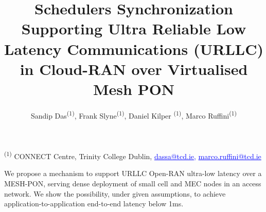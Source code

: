 \documentclass[a4paper, oneside, twocolumn, notitlepage, 10pt]{extarticle_ecoc}
\begin{document}


\title{Schedulers Synchronization Supporting Ultra Reliable Low Latency Communications (URLLC) in Cloud-RAN over Virtualised Mesh PON }%

\author{\vspace{-0.3in}
    Sandip Das\textsuperscript{(1)}, Frank Slyne\textsuperscript{(1)}, Daniel Kilper \textsuperscript{(1)}, Marco Ruffini\textsuperscript{(1)}
}

\maketitle                  %


\begin{strip}
 \begin{author_descr}

   \textsuperscript{(1)} CONNECT Centre, Trinity College Dublin,
   \textcolor{blue}{\uline{dassa@tcd.ie}, \uline{marco.ruffini@tcd.ie}}
 \end{author_descr}
\vspace{-0.1in}
\end{strip}



\begin{strip}
  \begin{ecoc_abstract}
    We propose a mechanism to support URLLC Open-RAN ultra-low latency over a MESH-PON, serving dense deployment of small cell and MEC nodes in an access network. We show the possibility, under given assumptions, to achieve application-to-application end-to-end latency below 1ms.
  \end{ecoc_abstract}
\vspace*{-0.15in}
\end{strip}

\end{document}
